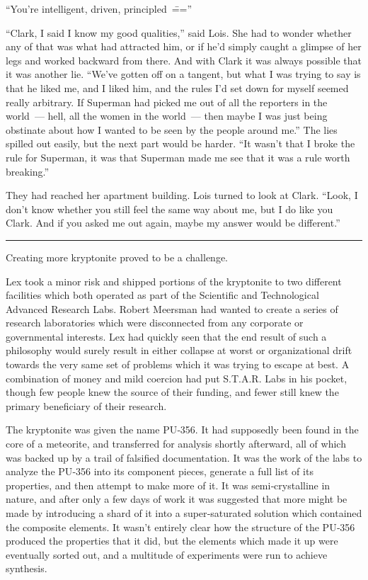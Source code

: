 ``You're intelligent, driven, principled~\===''

``Clark, I said I know my good qualities,'' said Lois. She had to wonder
whether any of that was what had attracted him, or if he'd simply caught
a glimpse of her legs and worked backward from there. And with Clark it
was always possible that it was another lie. ``We've gotten off on a
tangent, but what I was trying to say is that he liked me, and I liked
him, and the rules I'd set down for myself seemed really arbitrary. If
Superman had picked me out of all the reporters in the world~--- hell,
all the women in the world~--- then maybe I was just being obstinate
about how I wanted to be seen by the people around me.'' The lies
spilled out easily, but the next part would be harder. ``It wasn't that
I broke the rule for Superman, it was that Superman made me see that it
was a rule worth breaking.''

They had reached her apartment building. Lois turned to look at Clark.
``Look, I don't know whether you still feel the same way about me, but I
do like you Clark. And if you asked me out again, maybe my answer would
be different.''

\begin{center}\rule{0.5\linewidth}{0.5pt}\end{center}

Creating more kryptonite proved to be a challenge.

Lex took a minor risk and shipped portions of the kryptonite to two
different facilities which both operated as part of the Scientific and
Technological Advanced Research Labs. Robert Meersman had wanted to
create a series of research laboratories which were disconnected from
any corporate or governmental interests. Lex had quickly seen that the
end result of such a philosophy would surely result in either collapse
at worst or organizational drift towards the very same set of problems
which it was trying to escape at best. A combination of money and mild
coercion had put S.T.A.R. Labs in his pocket, though few people knew the
source of their funding, and fewer still knew the primary beneficiary of
their research.

The kryptonite was given the name PU‐356. It had supposedly been found
in the core of a meteorite, and transferred for analysis shortly
afterward, all of which was backed up by a trail of falsified
documentation. It was the work of the labs to analyze the PU‐356 into
its component pieces, generate a full list of its properties, and then
attempt to make more of it. It was semi‐crystalline in nature, and after
only a few days of work it was suggested that more might be made by
introducing a shard of it into a super‐saturated solution which
contained the composite elements. It wasn't entirely clear how the
structure of the PU‐356 produced the properties that it did, but the
elements which made it up were eventually sorted out, and a multitude of
experiments were run to achieve synthesis.

